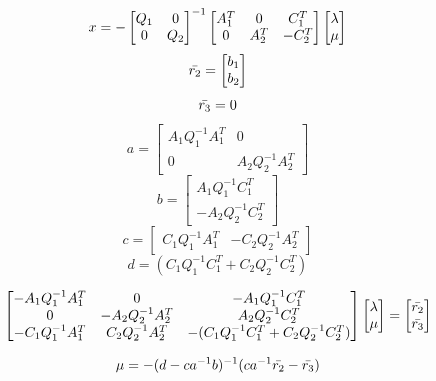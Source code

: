\begin{equation}{\label{eq.1}}
    x = - \begin{bmatrix}
    Q_1 & 0 \\
    0 & Q_2 
\end{bmatrix}^{-1} \begin{bmatrix}
    A_1^T & 0 & C_1^T\\
    0 & A_2^T & -C_2^T
\end{bmatrix}
\begin{bmatrix}
    \lambda \\
    \mu
\end{bmatrix}
\end{equation}
\[
\Bar{r_2} = \begin{bmatrix}
    b_1 \\
    b_2 
\end{bmatrix}
\]
\[
\Bar{r_3} = 0
\]
\[ a =  
\begin{bmatrix}
     A_1 Q_1^{-1} A_1 ^T & 0 \\
     0 & A_2 Q_2^{-1} A_2^T 
 \end{bmatrix}
\]
\[ b = 
\begin{bmatrix}
    A_1 Q_1^{-1} C_1^T \\
    - A_2 Q_2^{-1} C_2^T
\end{bmatrix}
\]
\[ c = 
\begin{bmatrix}
    C_1 Q_1^{-1} A_1^T & -C_2 Q_2^{-1} A_2^T
\end{bmatrix}
\]
\[ d =  ( C_1 Q_1^{-1} C_1^{T} + C_2 Q_2^{-1} C_2^T )
\]

\[
\begin{bmatrix}
    -A_1 Q_1^{-1} A_1 ^T & 0 & -A_1 Q_1^{-1} C_1^T \\
    0 & -A_2 Q_2^{-1} A_2^T &  A_2 Q_2^{-1} C_2^T\\
    -C_1 Q_1^{-1} A_1^T & C_2 Q_2^{-1} A_2^T &  -( C_1 Q_1^{-1} C_1^{T} + C_2 Q_2^{-1} C_2^T )
\end{bmatrix}
\begin{bmatrix}
    \lambda \\ 
    \mu
\end{bmatrix} =  
\begin{bmatrix}
    \Bar{r_2} \\
    \Bar{r_3}
\end{bmatrix}
\]

\begin{equation}{\label{eq.2}}
     \mu = - (d - ca^{-1} b)^{-1} (c a^{-1} \Bar{r_2} - \Bar{r_3})
\end{equation}

